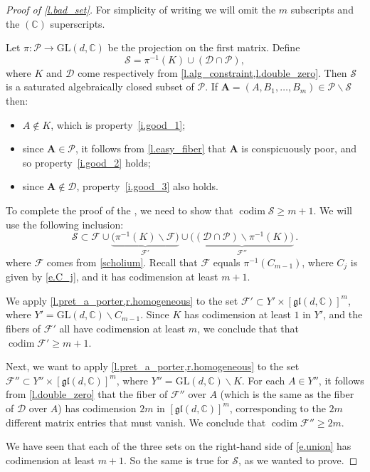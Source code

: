 \documentclass[10pt, a4paper]{amsart}
\theoremstyle{plain}
\theoremstyle{definition}
\theoremstyle{remark}
\theoremstyle{note}
\numberwithin{equation}{section}
\begin{document}
\begin{proof}[Proof of \cref{l.bad_set}]
For simplicity of writing we will omit the $m$ subscripts and the $({\mathbb{C}})$ superscripts.

Let $\pi: {\mathcal{P}} \to {\mathrm{GL}}(d,{\mathbb{C}})$ be the projection on the first matrix.
Define
$$
{\mathcal{S}} = \pi^{-1}(K) \cup ({\mathcal{D}} \cap {\mathcal{P}}),
$$
where $K$ and ${\mathcal{D}}$ come respectively from \cref{l.alg_constraint,l.double_zero}.
Then ${\mathcal{S}}$ is a saturated algebraically closed subset of ${\mathcal{P}}$. 
If ${\mathbf{A}} = (A, B_1, \dots, B_m) \in {\mathcal{P}} {\smallsetminus} {\mathcal{S}}$ then:
\begin{itemize}
\item $A \not\in K$, which is property~\ref{i.good_1};
\item since ${\mathbf{A}} \in {\mathcal{P}}$, it follows from \cref{l.easy_fiber} that ${\mathbf{A}}$ is conspicuously poor,
and so property~\ref{i.good_2} holds;
\item since ${\mathbf{A}} \not\in {\mathcal{D}}$, property~\ref{i.good_3} also holds.
\end{itemize}

To complete the proof of the , we need to show that $\operatorname{codim} {\mathcal{S}} \ge m+1$.
We will use the following inclusion:
\begin{equation}\label{e.union}
{\mathcal{S}} \subset {\mathcal{F}} \cup \underbrace{\big( \pi^{-1}(K) {\smallsetminus} {\mathcal{F}} \big)}_{{\mathcal{F}}'} \cup 
\underbrace{\big( ({\mathcal{D}} \cap {\mathcal{P}}) {\smallsetminus} \pi^{-1}(K)\big)}_{{\mathcal{F}}''} \, .
\end{equation}
where ${\mathcal{F}}$ comes from \cref{scholium}.
Recall that ${\mathcal{F}}$ equals $\pi^{-1}(C_{m-1})$, where $C_j$ is given by \eqref{e.C_j},
and it has codimension at least $m+1$.

We apply \cref{l.pret_a_porter,r.homogeneous}
to the set ${\mathcal{F}}' \subset Y' \times [{\mathfrak{gl}}(d,{\mathbb{C}})]^m$, 
where $Y' = {\mathrm{GL}}(d,{\mathbb{C}}) {\smallsetminus} C_{m-1}$.
Since $K$ has codimension at least $1$ in $Y'$,
and the fibers of ${\mathcal{F}}'$ all have codimension at least $m$, 
we conclude that that $\operatorname{codim} {\mathcal{F}}' \ge m+1$.

Next, we want to apply \cref{l.pret_a_porter,r.homogeneous}
to the set ${\mathcal{F}}'' \subset Y'' \times [{\mathfrak{gl}}(d,{\mathbb{C}})]^m$, 
where $Y'' = {\mathrm{GL}}(d,{\mathbb{C}}) {\smallsetminus} K$.
For each $A \in Y''$, it follows from \cref{l.double_zero}
that the fiber of ${\mathcal{F}}''$ over $A$ (which is the same as the fiber of ${\mathcal{D}}$ over $A$)
has codimension $2m$ in $[{\mathfrak{gl}}(d,{\mathbb{C}})]^m$,
corresponding to the $2m$ different matrix entries that must vanish.
We conclude that $\operatorname{codim} {\mathcal{F}}'' \ge 2m$.

We have seen that each of the three sets on the right-hand side of \eqref{e.union}
has codimension at least $m+1$.
So the same is true for ${\mathcal{S}}$, as we wanted to prove.
\end{proof}
\end{document}
